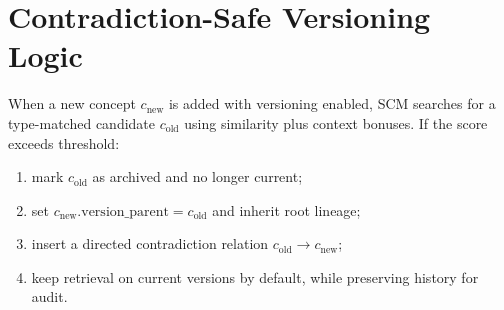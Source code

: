 \documentclass[11pt,a4paper]{article}
\begin{document}
\section{Contradiction-Safe Versioning Logic}
When a new concept $c_{\text{new}}$ is added with versioning enabled, SCM searches for a type-matched candidate $c_{\text{old}}$ using similarity plus context bonuses. If the score exceeds threshold:
\begin{enumerate}[leftmargin=1.4em]
    \item mark $c_{\text{old}}$ as archived and no longer current;
    \item set $c_{\text{new}}.\text{version\_parent}=c_{\text{old}}$ and inherit root lineage;
    \item insert a directed contradiction relation $c_{\text{old}} \rightarrow c_{\text{new}}$;
    \item keep retrieval on current versions by default, while preserving history for audit.
\end{enumerate}



\end{document}
